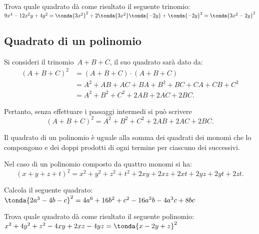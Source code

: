 \begin{esempio} Trova quale quadrato dà come risultato il seguente 
trinomio:\\
\(9x^4 - 12 x^2 y + 4y^2= 
\tonda{3x^2}^2 +2\tonda{3x^2}\tonda{-2y}+\tonda{-2y}^2=
\tonda{3x^2-2y}^2\)
\end{esempio}


\subsection{Quadrato di un polinomio}
\label{subsec:11_prodnot_quadratopolinomio}

Si consideri il trinomio~\(A+B+C\), il suo quadrato sarà dato da:
\begin{align*}
\left(A+B+C\right)^{2}&=\left(A+B+C\right)\cdot\left(A+B+C\right)\\
&=A^{2}+{AB}+{AC}+{BA}+B^{2}+{BC}+{CA}+{CB}+C^{2}\\
&=A^{2}+B^{2}+C^{2}+2{AB}+2{AC}+2{BC}.
\end{align*}


Pertanto, senza effettuare i passaggi intermedi si può scrivere
\[\left(A+B+C\right)^{2}=A^{2}+B^{2}+C^{2}+2{AB}+2{AC}+2{BC}.\]

\osservazione Il quadrato di un polinomio è uguale alla somma
dei quadrati dei monomi che lo compongono e dei doppi prodotti di ogni
termine per ciascuno dei successivi.

Nel caso di un polinomio composto da quattro monomi si ha:
\[\left(x+y+z+t\right)^{2}=x^{2}+y^{2}+z^{2}+t^{2}+2{xy}+2{xz}+2{xt}+2{yz}+2
{yt}+2{zt}.\]

\begin{esempio} Calcola il seguente quadrato:\\
\(\tonda{2a^3-4b-c}^2 = 4a^6 + 16b^2 +c^2 -16a^3 b -4 a^3 c +8 bc\)
\end{esempio}

\begin{esempio} Trova quale quadrato dà come risultato il seguente 
polinomio:\\
\(x^2 + 4y^2 + z^2 -4xy +2xz -4yz = \tonda{x-2y+z}^2\)
\end{esempio}


